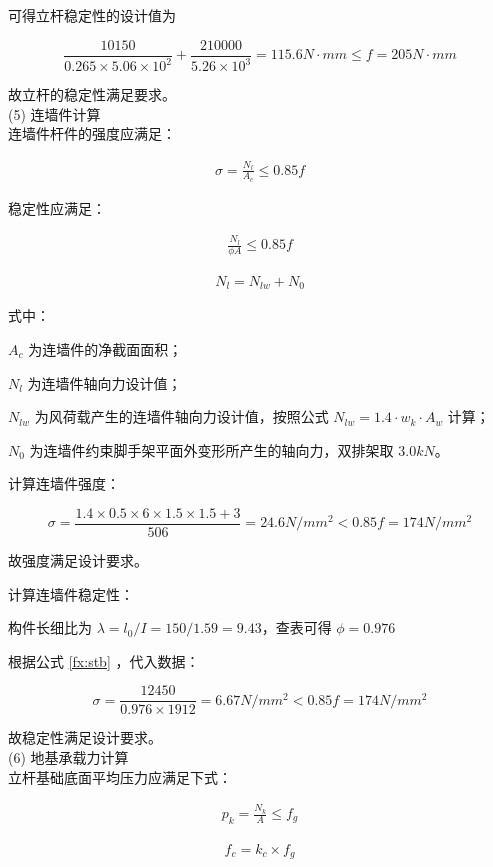 可得立杆稳定性的设计值为

$$\frac{10150}{0.265×5.06×10^2}+\frac{210000}{5.26×10^3}=115.6 N\cdot mm \leq f=205 N\cdot mm$$

故立杆的稳定性满足要求。\\

(5) 连墙件计算\\

连墙件杆件的强度应满足：

\begin{align}
    \sigma =\frac{N_l}{A_c}\leq 0.85f
\end{align}

稳定性应满足：

\begin{align}
    \label{fx:stb}    
    \frac{N_l}{\phi A}\leq 0.85f
\end{align}

\begin{align}
    N_l=N_{lw}+N_0
\end{align}

式中：

$A_c$ 为连墙件的净截面面积；  

$N_l$ 为连墙件轴向力设计值；   

$N_{lw}$ 为风荷载产生的连墙件轴向力设计值，按照公式 $N_{lw}=1.4\cdot w_k\cdot A_w$ 计算；

$N_0$ 为连墙件约束脚手架平面外变形所产生的轴向力，双排架取 $3.0kN$。

计算连墙件强度： 

$$\sigma=\frac{1.4×0.5×6×1.5×1.5+3}{506}=24.6 N/mm^2<0.85f=174 N/mm^2$$

故强度满足设计要求。

计算连墙件稳定性：

构件长细比为 $\lambda =l_0/I=150/1.59=9.43$，查表可得 $\phi=0.976$

根据公式 \ref{fx:stb} ，代入数据：

$$\sigma =\frac{12450}{0.976\times 1912}=6.67 N/mm^2<0.85f=174 N/mm^2$$

故稳定性满足设计要求。\\

(6) 地基承载力计算\\

立杆基础底面平均压力应满足下式：

\begin{align}
    p_k=\frac{N_k}{A} \leq f_g
\end{align}

\begin{align}
    f_c=k_c\times f_{g}
\end{align}

